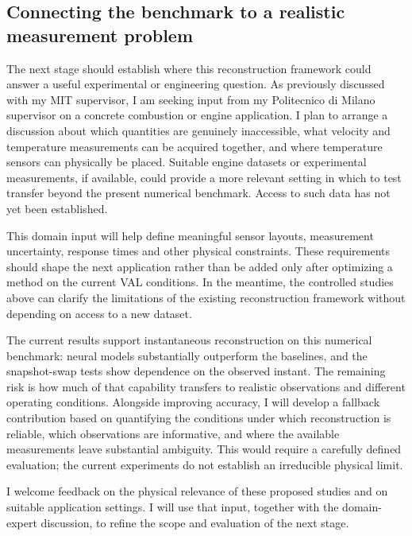 \documentclass[11pt,letterpaper]{article}
\begin{document}
\subsection*{Connecting the benchmark to a realistic measurement problem}

The next stage should establish where this reconstruction framework could answer a useful experimental or engineering question. As previously discussed with my MIT supervisor, I am seeking input from my Politecnico di Milano supervisor on a concrete combustion or engine application. I plan to arrange a discussion about which quantities are genuinely inaccessible, what velocity and temperature measurements can be acquired together, and where temperature sensors can physically be placed. Suitable engine datasets or experimental measurements, if available, could provide a more relevant setting in which to test transfer beyond the present numerical benchmark. Access to such data has not yet been established.

This domain input will help define meaningful sensor layouts, measurement uncertainty, response times and other physical constraints. These requirements should shape the next application rather than be added only after optimizing a method on the current VAL conditions. In the meantime, the controlled studies above can clarify the limitations of the existing reconstruction framework without depending on access to a new dataset.

The current results support instantaneous reconstruction on this numerical benchmark: neural models substantially outperform the baselines, and the snapshot-swap tests show dependence on the observed instant. The remaining risk is how much of that capability transfers to realistic observations and different operating conditions. Alongside improving accuracy, I will develop a fallback contribution based on quantifying the conditions under which reconstruction is reliable, which observations are informative, and where the available measurements leave substantial ambiguity. This would require a carefully defined evaluation; the current experiments do not establish an irreducible physical limit.

I welcome feedback on the physical relevance of these proposed studies and on suitable application settings. I will use that input, together with the domain-expert discussion, to refine the scope and evaluation of the next stage.

\clearpage
\appendix
\end{document}
